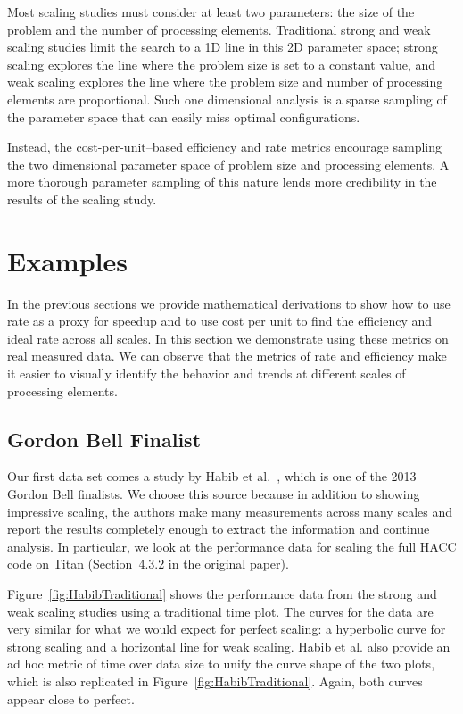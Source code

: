 \documentclass{llncs}
\newcommand*{\scite}[1]{~\cite{#1}}
\newcommand{\etal}{et al.\xspace}
\begin{document}
Most scaling studies must consider at least two parameters: the size of the
problem and the number of processing elements. Traditional strong and
weak scaling studies limit the search to a 1D line in this 2D parameter
space; strong scaling explores the line where the problem size is set to a
constant value, and weak scaling explores the line where the problem size
and number of processing elements are proportional. Such one dimensional
analysis is a sparse sampling of the parameter space that can easily miss
optimal configurations.

Instead, the cost-per-unit--based efficiency and rate metrics encourage
sampling the two dimensional parameter space of problem size and processing
elements. A more thorough parameter sampling of this nature lends more
credibility in the results of the scaling study.


\section{Examples}

\noindent
In the previous sections we provide mathematical derivations to show how
to use rate as a proxy for speedup and to use cost per unit to find the
efficiency and ideal rate across all scales. In this section we demonstrate
using these metrics on real measured data. We can observe that the metrics
of rate and efficiency make it easier to visually identify the behavior and
trends at different scales of processing elements.

\subsection{Gordon Bell Finalist}

\noindent
Our first data set comes a study by Habib \etal\scite{Habib2013}, which is
one of the 2013 Gordon Bell finalists. We choose this source because in
addition to showing impressive scaling, the authors make many measurements
across many scales and report the results completely enough to extract the
information and continue analysis. In particular, we look at the
performance data for scaling the full HACC code on Titan (Section~4.3.2 in
the original paper).

Figure~\ref{fig:HabibTraditional} shows the performance data from the
strong and weak scaling studies using a traditional time plot. The curves
for the data are very similar for what we would expect for perfect scaling:
a hyperbolic curve for strong scaling and a horizontal line for weak
scaling. Habib \etal also provide an ad hoc metric of time over data size
to unify the curve shape of the two plots, which is also replicated in
Figure~\ref{fig:HabibTraditional}. Again, both curves appear close to
perfect.
\end{document}
